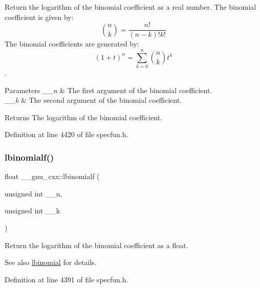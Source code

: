 Return the logarithm of the binomial coefficient as a real number. The binomial coefficient is given by\+: \[ \binom{n}{k} = \frac{n!}{(n-k)! k!} \] The binomial coefficients are generated by\+: \[ \left(1 + t\right)^n = \sum_{k=0}^n \binom{n}{k} t^k \]. 


\begin{DoxyParams}{Parameters}
{\em \+\_\+\+\_\+n} & The first argument of the binomial coefficient. \\
\hline
{\em \+\_\+\+\_\+k} & The second argument of the binomial coefficient. \\
\hline
\end{DoxyParams}
\begin{DoxyReturn}{Returns}
The logarithm of the binomial coefficient. 
\end{DoxyReturn}


Definition at line 4420 of file specfun.\+h.

\mbox{\label{group__mathsf__gnu_ga2fe55bab4211fb240e1eb01341914129}} 
\subsubsection{\texorpdfstring{lbinomialf()}{lbinomialf()}}
{\footnotesize\ttfamily float \+\_\+\+\_\+gnu\+\_\+cxx\+::lbinomialf (\begin{DoxyParamCaption}\item[{unsigned int}]{\+\_\+\+\_\+n,  }\item[{unsigned int}]{\+\_\+\+\_\+k }\end{DoxyParamCaption})\hspace{0.3cm}{\ttfamily [inline]}}

Return the logarithm of the binomial coefficient as a {\ttfamily float}.

\begin{DoxySeeAlso}{See also}
\hyperlink{group__mathsf__gnu_gabfa5aeba56edfa110846fc8e76963bc2}{lbinomial} for details. 
\end{DoxySeeAlso}


Definition at line 4391 of file specfun.\+h.

\mbox{\label{group__mathsf__gnu_ga20e6c250e10e20b9e2c3f68bf9a3d4c1}} 
